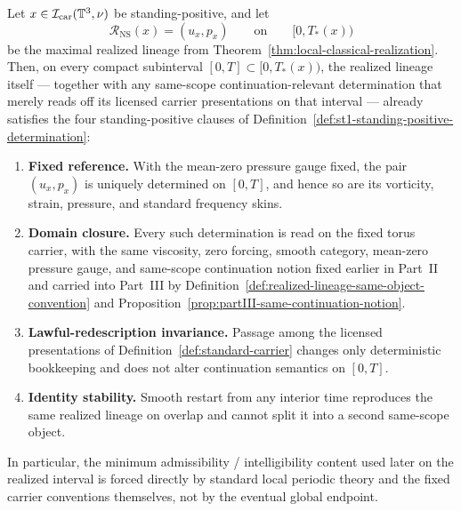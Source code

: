 \begin{manualtheorem}
\label{thm:pde-native-admissibility-maximal-interval}
Let $x\in\mathcal I_{\mathrm{car}}(\mathbb{T}^3,\nu)$ be standing-positive, and let
\[
\mathcal R_{\mathrm{NS}}(x)=(u_x,p_x)
\qquad\text{on}\qquad [0,T_*(x))
\]
be the maximal realized lineage from Theorem~\ref{thm:local-classical-realization}. Then, on every compact subinterval $[0,T]\subset[0,T_*(x))$, the realized lineage itself --- together with any same-scope continuation-relevant determination that merely reads off its licensed carrier presentations on that interval --- already satisfies the four standing-positive clauses of Definition~\ref{def:st1-standing-positive-determination}:
\begin{enumerate}[label=(\roman*), leftmargin=2.2em]
\item \textbf{Fixed reference.} With the mean-zero pressure gauge fixed, the pair $(u_x,p_x)$ is uniquely determined on $[0,T]$, and hence so are its vorticity, strain, pressure, and standard frequency skins.
\item \textbf{Domain closure.} Every such determination is read on the fixed torus carrier, with the same viscosity, zero forcing, smooth category, mean-zero pressure gauge, and same-scope continuation notion fixed earlier in Part~II and carried into Part~III by Definition~\ref{def:realized-lineage-same-object-convention} and Proposition~\ref{prop:partIII-same-continuation-notion}.
\item \textbf{Lawful-redescription invariance.} Passage among the licensed presentations of Definition~\ref{def:standard-carrier} changes only deterministic bookkeeping and does not alter continuation semantics on $[0,T]$.
\item \textbf{Identity stability.} Smooth restart from any interior time reproduces the same realized lineage on overlap and cannot split it into a second same-scope object.
\end{enumerate}
In particular, the minimum admissibility / intelligibility content used later on the realized interval is forced directly by standard local periodic theory and the fixed carrier conventions themselves, not by the eventual global endpoint.
\end{manualtheorem}

